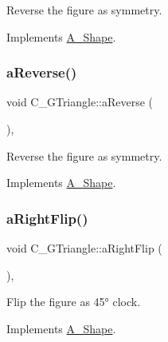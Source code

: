 Reverse the figure as symmetry. 



Implements \hyperlink{classA__Shape_afe2c7969d647f6358da13879a7534ecb}{A\+\_\+\+Shape}.

\mbox{\label{classC__GTriangle_a479646fa1265aaf2299b59787c394a27}} 
\subsubsection{\texorpdfstring{a\+Reverse()}{aReverse()}\hspace{0.1cm}{\footnotesize\ttfamily [2/2]}}
{\footnotesize\ttfamily void C\+\_\+\+G\+Triangle\+::a\+Reverse (\begin{DoxyParamCaption}{ }\end{DoxyParamCaption})\hspace{0.3cm}{\ttfamily [override]}, {\ttfamily [virtual]}}



Reverse the figure as symmetry. 



Implements \hyperlink{classA__Shape_afe2c7969d647f6358da13879a7534ecb}{A\+\_\+\+Shape}.

\mbox{\label{classC__GTriangle_aa4f808a02ae18bd36c205a5d70eb3fef}} 
\subsubsection{\texorpdfstring{a\+Right\+Flip()}{aRightFlip()}\hspace{0.1cm}{\footnotesize\ttfamily [1/2]}}
{\footnotesize\ttfamily void C\+\_\+\+G\+Triangle\+::a\+Right\+Flip (\begin{DoxyParamCaption}{ }\end{DoxyParamCaption})\hspace{0.3cm}{\ttfamily [override]}, {\ttfamily [virtual]}}



Flip the figure as 45° clock. 



Implements \hyperlink{classA__Shape_a892688cbbad3297e00e87cce0dbfc76d}{A\+\_\+\+Shape}.


